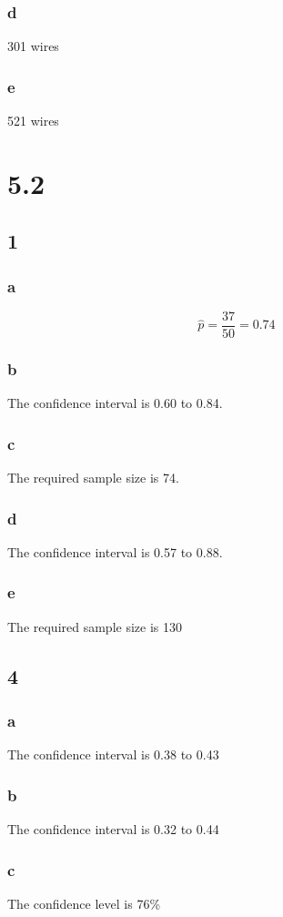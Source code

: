 \documentclass[11pt]{article}
\begin{document}
\subsubsection*{d}
301 wires
\subsubsection*{e}
521 wires
\section*{5.2}
\subsection*{1}
\subsubsection*{a}
\[ \hat{p} = \frac{37}{50} = 0.74 \]
\subsubsection*{b}
The confidence interval is 0.60 to 0.84.
\subsubsection*{c}
The required sample size is 74.
\subsubsection*{d}
The confidence interval is 0.57 to 0.88.
\subsubsection*{e}
The required sample size is 130
\subsection*{4}
\subsubsection*{a}
The confidence interval is 0.38 to 0.43
\subsubsection*{b}
The confidence interval is 0.32 to 0.44
\subsubsection*{c}
The confidence level is 76\%
\end{document}
